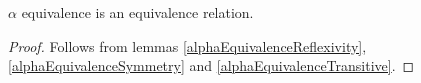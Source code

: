 \begin{theorem}
  $\alpha$ equivalence is an equivalence relation.
  \begin{proof}
    Follows from lemmas \ref{alphaEquivalenceReflexivity}, \ref{alphaEquivalenceSymmetry} and \ref{alphaEquivalenceTransitive}.
  \end{proof}
\end{theorem}



% 
